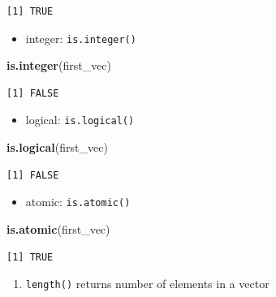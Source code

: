 \documentclass[]{book}
\newenvironment{Shaded}{\begin{snugshade}}{\end{snugshade}}
\newcommand{\KeywordTok}[1]{\textcolor[rgb]{0.13,0.29,0.53}{\textbf{#1}}}
\newcommand{\NormalTok}[1]{#1}
\providecommand{\tightlist}{%
  \setlength{\itemsep}{0pt}\setlength{\parskip}{0pt}}
\begin{document}
\begin{verbatim}
[1] TRUE
\end{verbatim}

\begin{itemize}
\tightlist
\item
  integer: \texttt{is.integer()}
\end{itemize}

\begin{Shaded}
\begin{Highlighting}[]
\KeywordTok{is.integer}\NormalTok{(first_vec)}
\end{Highlighting}
\end{Shaded}

\begin{verbatim}
[1] FALSE
\end{verbatim}

\begin{itemize}
\tightlist
\item
  logical: \texttt{is.logical()}
\end{itemize}

\begin{Shaded}
\begin{Highlighting}[]
\KeywordTok{is.logical}\NormalTok{(first_vec)}
\end{Highlighting}
\end{Shaded}

\begin{verbatim}
[1] FALSE
\end{verbatim}

\begin{itemize}
\tightlist
\item
  atomic: \texttt{is.atomic()}
\end{itemize}

\begin{Shaded}
\begin{Highlighting}[]
\KeywordTok{is.atomic}\NormalTok{(first_vec)}
\end{Highlighting}
\end{Shaded}

\begin{verbatim}
[1] TRUE
\end{verbatim}

\begin{enumerate}
\def\labelenumi{\arabic{enumi}.}
\setcounter{enumi}{2}
\tightlist
\item
  \texttt{length()} returns number of elements in a vector
\end{enumerate}
\end{document}
